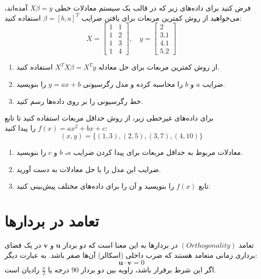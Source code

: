 \begin{exercise}
	فرض کنید برای داده‌های زیر که در قالب یک سیستم معادلات خطی \(X\beta = y\) آمده‌اند، می‌خواهید از روش کمترین مربعات برای یافتن ضرایب \(\beta = [b, a]^T\) استفاده کنید:
	\[
	X = \begin{bmatrix}
		1 & 1 \\
		1 & 2 \\
		1 & 3 \\
		1 & 4
	\end{bmatrix}, \quad
	y = \begin{bmatrix}
		2 \\
		3.1 \\
		4.1 \\
		5.2
	\end{bmatrix}
	\]
	\begin{enumerate}
		\item از روش کمترین مربعات برای حل معادله \(X^T X \beta = X^T y\) استفاده کنید.
		\item ضرایب \(a\) و \(b\) را محاسبه کرده و مدل رگرسیونی \(y = ax + b\) را بنویسید.
		\item خط رگرسیونی را بر روی داده‌ها رسم کنید.
	\end{enumerate}
	
\end{exercise}
\begin{exercise}
	برای داده‌های غیرخطی زیر، از روش حداقل مربعات استفاده کنید تا تابع \(f(x) = ax^2 + bx + c\) را پیدا کنید:
	\[
	(x, y) = \{(1, 3), (2, 5), (3, 7), (4, 10)\}
	\]
	\begin{enumerate}
		\item معادلات مربوط به حداقل مربعات برای پیدا کردن ضرایب \(a\)، \(b\) و \(c\) را بنویسید.
		\item ضرایب این مدل را با حل معادلات به دست آورید.
		\item تابع \(f(x)\) را بنویسید و آن را برای داده‌های مختلف پیش‌بینی کنید.
	\end{enumerate}
\end{exercise}
\section{تعامد در بردارها}
تعامد $(Orthogonality)$ در بردارها به این معنا است که دو بردار \( \mathbf{u} \) و \( \mathbf{v} \) در یک فضای برداری زمانی متعامد هستند که ضرب داخلی (اسکالر) آن‌ها صفر باشد. به عبارت دیگر:
\[
\mathbf{u} \cdot \mathbf{v} = 0
\]
اگر این شرط برقرار باشد، زاویه بین دو بردار \(90\) درجه یا \( \frac{\pi}{2} \) رادیان است.

